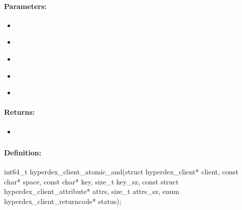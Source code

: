 \paragraph{Parameters:}
\begin{itemize}[noitemsep]
\item {}\\

\item {}\\

\item {}\\

\item {}\\

\item {}\\

\end{itemize}

\paragraph{Returns:}
\begin{itemize}[noitemsep]
\item {}\\

\end{itemize}

\pagebreak
\subsubsection{}
\label{api:c:atomic_and}


\paragraph{Definition:}
\begin{ccode}
int64_t hyperdex_client_atomic_and(struct hyperdex_client* client,
        const char* space,
        const char* key, size_t key_sz,
        const struct hyperdex_client_attribute* attrs, size_t attrs_sz,
        enum hyperdex_client_returncode* status);
\end{ccode}

